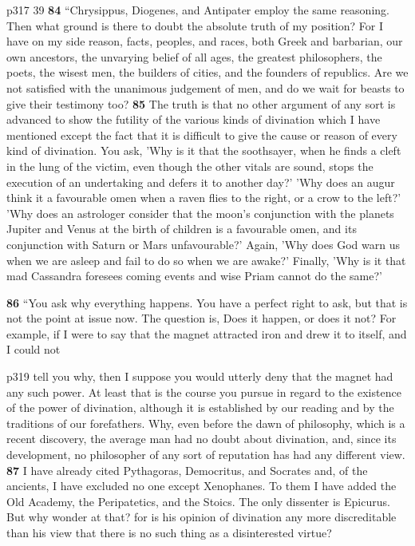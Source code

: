 p317
39
\textbf{84} ``Chrysippus, Diogenes, and Antipater employ the same reasoning. Then what ground is there to doubt the absolute truth of my position? For I have on my side reason, facts, peoples, and races, both Greek and barbarian, our own ancestors, the unvarying belief of all ages, the greatest philosophers, the poets, the wisest men, the builders of cities, and the founders of republics. Are we not satisfied with the unanimous judgement of men, and do we wait for beasts to give their testimony too? \textbf{85} The truth is that no other argument of any sort is advanced to show the futility of the various kinds of divination which I have mentioned except the fact that it is difficult to give the cause or reason of every kind of divination. You ask, 'Why is it that the soothsayer, when he finds a cleft in the lung of the victim, even though the other vitals are sound, stops the execution of an undertaking and defers it to another day?' 'Why does an augur think it a favourable omen when a raven flies to the right, or a crow to the left?' 'Why does an astrologer consider that the moon's conjunction with the planets Jupiter and Venus at the birth of children is a favourable omen, and its conjunction with Saturn or Mars unfavourable?' Again, 'Why does God warn us when we are asleep and fail to do so when we are awake?' Finally, 'Why is it that mad Cassandra foresees coming events and wise Priam cannot do the same?'

\textbf{86} ``You ask why everything happens. You have a perfect right to ask, but that is not the point at issue now. The question is, Does it happen, or does it not? For example, if I were to say that the magnet attracted iron and drew it to itself, and I could not

p319 tell you why, then I suppose you would utterly deny that the magnet had any such power. At least that is the course you pursue in regard to the existence of the power of divination, although it is established by our reading and by the traditions of our forefathers. Why, even before the dawn of philosophy, which is a recent discovery, the average man had no doubt about divination, and, since its development, no philosopher of any sort of reputation has had any different view. \textbf{87} I have already cited Pythagoras, Democritus, and Socrates and, of the ancients, I have excluded no one except Xenophanes. To them I have added the Old Academy, the Peripatetics, and the Stoics. The only dissenter is Epicurus. But why wonder at that? for is his opinion of divination any more discreditable than his view that there is no such thing as a disinterested virtue?

